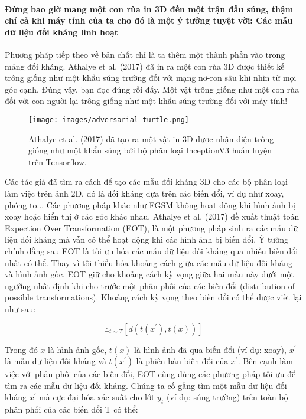 \paragraph{Đừng bao giờ mang một con rùa in 3D đến một trận đấu súng, thậm chí cả khi máy tính của ta cho đó là một ý tưởng tuyệt vời: Các mẫu dữ liệu đối kháng linh hoạt}

Phương pháp tiếp theo về bản chất chỉ là ta thêm một thành phần vào trong mảng đối kháng. Athalye et al. (2017) đã in ra một con rùa 3D được thiết kế trông giống như một khẩu súng trường đối với mạng nơ-ron sâu khi nhìn từ  mọi góc cạnh. Đúng vậy, bạn đọc đúng rồi đấy. Một vật trông  giống như một con rùa đối với con người lại trông giống như một khẩu súng trường đối với máy tính!

\begin{figure*}[h!]
	\centering
	\texttt{[image: images/adversarial-turtle.png]}
	\label{fig:6_6}
	\caption{Athalye et al. (2017) đã tạo ra một vật in 3D được nhận diện trông giống như một khẩu súng bởi bộ phân loại InceptionV3 huấn luyện trên Tensorflow.}
\end{figure*}

Các tác giả đã tìm ra cách để tạo các mẫu đối kháng 3D cho các bộ phân loại làm việc trên ảnh 2D, đó là đối kháng dựa trên các biến đổi, ví dụ như xoay, phóng to... Các phương pháp khác như FGSM không hoạt động khi hình ảnh bị xoay hoặc hiển thị ở các góc khác nhau. Athalye et al. (2017) đề xuất thuật toán Expection Over Transformation (EOT), là một phương pháp sinh ra các mẫu dữ liệu đối kháng mà vẫn có thể hoạt động khi các hình ảnh bị biến đổi. Ý tưởng chính đằng sau EOT là tối ưu hóa các mẫu dữ liệu đối kháng qua nhiều biến đổi nhất có thể. Thay vì tối thiểu hóa khoảng cách giữa các mẫu dữ liệu đối kháng và hình ảnh gốc, EOT giữ cho khoảng cách kỳ vọng giữa hai mẫu này dưới một ngưỡng nhất định khi cho trước một phân phối của các biến đổi (distribution of possible transformations). Khoảng cách kỳ vọng theo biến đổi có thể được viết lại như sau:

\[\mathbb{E}_{t\sim{}T}[d(t(x^\prime),t(x))]\]

Trong đó $x$ là hình ảnh gốc, $t(x)$ là hình ảnh đã qua biến đổi (ví dụ: xoay), $x^\prime$ là mẫu dữ liệu đối kháng và $t(x^\prime)$ là phiên bản biến đổi của $x^\prime$. Bên cạnh làm việc với phân phối của các biến đổi, EOT cũng dùng các phương pháp tối ưu để tìm ra các mẫu dữ liệu đối kháng. Chúng ta cố gắng tìm một mẫu dữ liệu đối kháng $x^\prime$ mà cực đại hóa xác suất cho lớt $y_t$ (ví dụ: súng trường) trên toàn bộ phân phối của các biến đổi T có thể:

